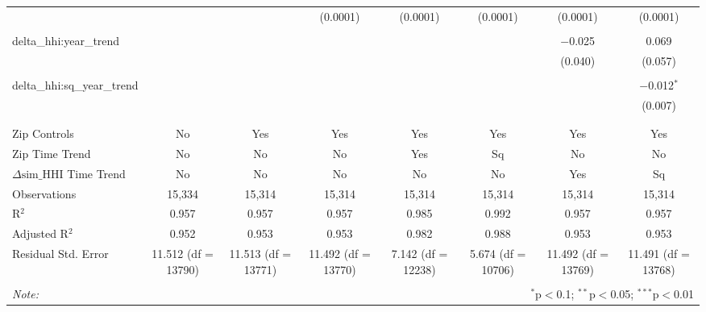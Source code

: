 \begin{table}[H]
{\begin{tabular}{@{\extracolsep{5pt}}lccccccc}
   &  &  & (0.0001) & (0.0001) & (0.0001) & (0.0001) & (0.0001) \\  

   & & & & & & & \\  

  delta\_hhi:year\_trend &  &  &  &  &  & $-$0.025 & 0.069 \\  

   &  &  &  &  &  & (0.040) & (0.057) \\  

   & & & & & & & \\  

  delta\_hhi:sq\_year\_trend &  &  &  &  &  &  & $-$0.012$^{*}$ \\  

   &  &  &  &  &  &  & (0.007) \\  

   & & & & & & & \\  

 \hline \\[-1.8ex]  

 Zip Controls & No & Yes & Yes & Yes & Yes & Yes & Yes \\  

 Zip Time Trend & No & No & No & Yes & Sq & No & No \\  

 $\Delta \text{sim\_HHI}$ Time Trend & No & No & No & No & No & Yes & Sq \\  

 Observations & 15,334 & 15,314 & 15,314 & 15,314 & 15,314 & 15,314 & 15,314 \\  

 R$^{2}$ & 0.957 & 0.957 & 0.957 & 0.985 & 0.992 & 0.957 & 0.957 \\  

 Adjusted R$^{2}$ & 0.952 & 0.953 & 0.953 & 0.982 & 0.988 & 0.953 & 0.953 \\  

 Residual Std. Error & 11.512 (df = 13790) & 11.513 (df = 13771) & 11.492 (df = 13770) & 7.142 (df = 12238) & 5.674 (df = 10706) & 11.492 (df = 13769) & 11.491 (df = 13768) \\  

 \hline  

 \hline \\[-1.8ex]  

 \textit{Note:}  & \multicolumn{7}{r}{$^{*}$p$<$0.1; $^{**}$p$<$0.05; $^{***}$p$<$0.01} \\  

 \end{tabular}}  

 \end{table}  

